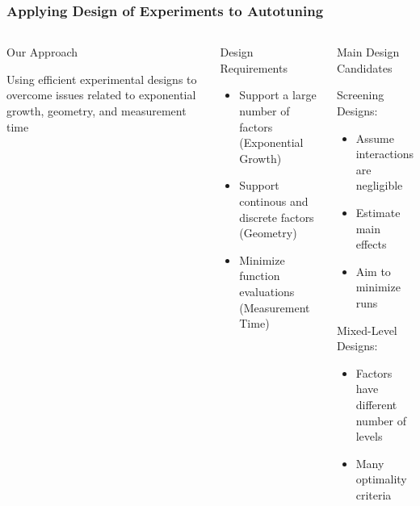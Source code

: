 \documentclass[10pt, compress, aspectratio=169, xcolor={table,usenames,dvipsnames}]{beamer}
\begin{document}
\begin{frame}
    \frametitle{Applying Design of Experiments to Autotuning}
    \begin{columns}[c]
            \begin{block}{Our Approach}

                \vspace{.2cm}

                Using \alert{efficient experimental designs} to overcome issues
                related to \alert{exponential growth}, \alert{geometry}, and
                \alert{measurement time}
            \end{block}

            \begin{block}{Design Requirements}
                \begin{itemize}
                    \item Support a large number of factors (\alert{Exponential Growth})
                    \item Support continous and discrete factors (\alert{Geometry})
                    \item Minimize function evaluations (\alert{Measurement Time})
                \end{itemize}
            \end{block}

            \begin{block}{Main Design Candidates}

                \vspace{.2cm}

                \alert{Screening} Designs:

                \begin{itemize}
                    \item Assume \alert{interactions are negligible}
                    \item Estimate \alert{main effects}
                    \item Aim to \alert{minimize runs}
                \end{itemize}

                \alert{Mixed-Level} Designs:

                \begin{itemize}
                    \item Factors have \alert{different number of levels}
                    \item Many \alert{optimality criteria}
                \end{itemize}

            \end{block}

    \end{columns}
\end{frame}
\end{document}
